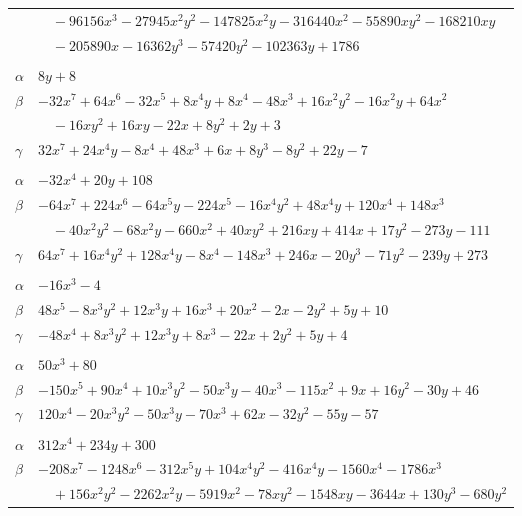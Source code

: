 \documentclass[11pt]{article}
\begin{document}
\begin{longtable}{@{}ll@{}}
 & $\quad -96156x^{3}-27945x^{2}y^{2}-147825x^{2}y-316440x^{2}-55890xy^{2}-168210xy$\\
 & $\quad -205890x-16362y^{3}-57420y^{2}-102363y+1786$\\
\addlinespace[3pt]
\multicolumn{2}{@{}l}{$\{i,j\}=\{59,63\}$, $k_{ij}=2\cdot 3^{2}$}\\
$\alpha$ & $8y+8$\\
$\beta$ & $-32x^{7}+64x^{6}-32x^{5}+8x^{4}y+8x^{4}-48x^{3}+16x^{2}y^{2}-16x^{2}y+64x^{2}$\\
 & $\quad -16xy^{2}+16xy-22x+8y^{2}+2y+3$\\
$\gamma$ & $32x^{7}+24x^{4}y-8x^{4}+48x^{3}+6x+8y^{3}-8y^{2}+22y-7$\\
\addlinespace[3pt]
\multicolumn{2}{@{}l}{$\{i,j\}=\{59,71\}$, $k_{ij}=2\cdot 3^{3}\cdot 5$}\\
$\alpha$ & $-32x^{4}+20y+108$\\
$\beta$ & $-64x^{7}+224x^{6}-64x^{5}y-224x^{5}-16x^{4}y^{2}+48x^{4}y+120x^{4}+148x^{3}$\\
 & $\quad -40x^{2}y^{2}-68x^{2}y-660x^{2}+40xy^{2}+216xy+414x+17y^{2}-273y-111$\\
$\gamma$ & $64x^{7}+16x^{4}y^{2}+128x^{4}y-8x^{4}-148x^{3}+246x-20y^{3}-71y^{2}-239y+273$\\
\addlinespace[3pt]
\multicolumn{2}{@{}l}{$\{i,j\}=\{59,75\}$, $k_{ij}=2\cdot 5$}\\
$\alpha$ & $-16x^{3}-4$\\
$\beta$ & $48x^{5}-8x^{3}y^{2}+12x^{3}y+16x^{3}+20x^{2}-2x-2y^{2}+5y+10$\\
$\gamma$ & $-48x^{4}+8x^{3}y^{2}+12x^{3}y+8x^{3}-22x+2y^{2}+5y+4$\\
\addlinespace[3pt]
\multicolumn{2}{@{}l}{$\{i,j\}=\{59,103\}$, $k_{ij}=2^{4}\cdot 3\cdot 5$}\\
$\alpha$ & $50x^{3}+80$\\
$\beta$ & $-150x^{5}+90x^{4}+10x^{3}y^{2}-50x^{3}y-40x^{3}-115x^{2}+9x+16y^{2}-30y+46$\\
$\gamma$ & $120x^{4}-20x^{3}y^{2}-50x^{3}y-70x^{3}+62x-32y^{2}-55y-57$\\
\addlinespace[3pt]
\multicolumn{2}{@{}l}{$\{i,j\}=\{60,70\}$, $k_{ij}=2^{3}\cdot 3^{3}\cdot 7$}\\
$\alpha$ & $312x^{4}+234y+300$\\
$\beta$ & $-208x^{7}-1248x^{6}-312x^{5}y+104x^{4}y^{2}-416x^{4}y-1560x^{4}-1786x^{3}$\\
 & $\quad +156x^{2}y^{2}-2262x^{2}y-5919x^{2}-78xy^{2}-1548xy-3644x+130y^{3}-680y^{2}$\\

\end{longtable}
\end{document}
